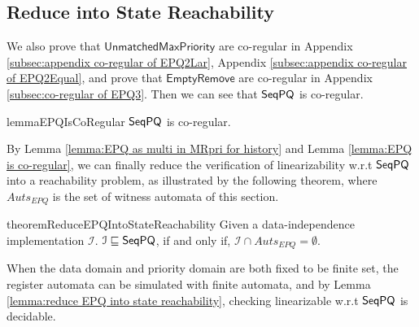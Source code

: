 \subsection{Reduce into State Reachability}
\label{subsec:combine step-by-step linearizability and co-regular}

We also prove that $\mathsf{UnmatchedMaxPriority}$ are co-regular in Appendix \ref{subsec:appendix co-regular of EPQ2Lar}, Appendix \ref{subsec:appendix co-regular of EPQ2Equal}, and prove that $\mathsf{EmptyRemove}$ are co-regular in Appendix \ref{subsec:co-regular of EPQ3}. Then we can see that $\mathsf{SeqPQ}$ is co-regular.

\begin{restatable}{lemma}{EPQIsCoRegular}
\label{lemma:EPQ is co-regular}
$\mathsf{SeqPQ}$ is co-regular.
\end{restatable}

By Lemma \ref{lemma:EPQ as multi in MRpri for history} and Lemma \ref{lemma:EPQ is co-regular}, we can finally reduce the verification of linearizability w.r.t $\mathsf{SeqPQ}$ into a reachability problem, as illustrated by the following theorem, where $\textit{Auts}_{\textit{EPQ}}$ is the set of witness automata of this section.

\begin{restatable}{theorem}{ReduceEPQIntoStateReachability}
\label{lemma:reduce EPQ into state reachability}
Given a data-independence implementation $\mathcal{I}$. $\mathcal{I} \sqsubseteq \mathsf{SeqPQ}$, if and only if, $\mathcal{I} \cap \textit{Auts}_{\textit{EPQ}} = \emptyset$.
\end{restatable}

When the data domain and priority domain are both fixed to be finite set, the register automata can be simulated with finite automata, and by Lemma \ref{lemma:reduce EPQ into state reachability}, checking linearizable w.r.t $\mathsf{SeqPQ}$ is decidable.




